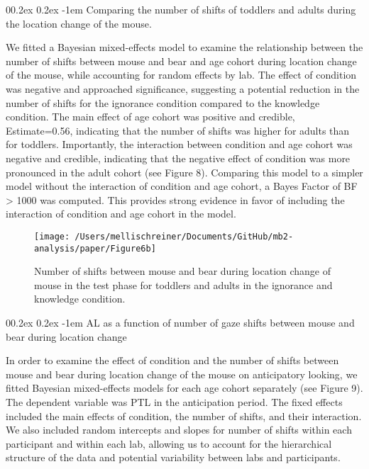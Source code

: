 \documentclass[
  man,floatsintext]{apa6}
\makeatletter
\let\oldparagraph\paragraph
\renewcommand{\paragraph}{
    \@ifstar
      \xxxParagraphStar
      \xxxParagraphNoStar
  }
\newcommand{\xxxParagraphStar}[1]{\oldparagraph*{#1}\mbox{}}
\newcommand{\xxxParagraphNoStar}[1]{\oldparagraph{#1}\mbox{}}
\renewcommand{\paragraph}{\@startsection{paragraph}{4}{\parindent}%
  {0\baselineskip \@plus 0.2ex \@minus 0.2ex}%
  {-1em}%
  {\normalfont\normalsize\bfseries\itshape\typesectitle}}
\makeatother
\begin{document}
\paragraph{Comparing the number of shifts of toddlers and adults during the location change of the mouse.}\label{comparing-the-number-of-shifts-of-toddlers-and-adults-during-the-location-change-of-the-mouse.}

We fitted a Bayesian mixed-effects model to examine the relationship between the number of shifts between mouse and bear and age cohort during location change of the mouse, while accounting for random effects by lab. The effect of condition was negative and approached significance, suggesting a potential reduction in the number of shifts for the ignorance condition compared to the knowledge condition. The main effect of age cohort was positive and credible, Estimate=0.56, indicating that the number of shifts was higher for adults than for toddlers. Importantly, the interaction between condition and age cohort was negative and credible, indicating that the negative effect of condition was more pronounced in the adult cohort (see Figure 8).
Comparing this model to a simpler model without the interaction of condition and age cohort, a Bayes Factor of BF \textgreater{} 1000 was computed.
This provides strong evidence in favor of including the interaction of condition and age cohort in the model.

\begin{figure}

{\centering \texttt{[image: /Users/mellischreiner/Documents/GitHub/mb2-analysis/paper/Figure6b]} 

}

\caption{Number of shifts between mouse and bear during location change of mouse in the test phase for toddlers and adults in the ignorance and knowledge condition.}\label{fig:fig8}
\end{figure}

\paragraph{AL as a function of number of gaze shifts between mouse and bear during location change}\label{al-as-a-function-of-number-of-gaze-shifts-between-mouse-and-bear-during-location-change}

In order to examine the effect of condition and the number of shifts between mouse and bear during location change of the mouse on anticipatory looking, we fitted Bayesian mixed-effects models for each age cohort separately (see Figure 9). The dependent variable was PTL in the anticipation period. The fixed effects included the main effects of condition, the number of shifts, and their interaction. We also included random intercepts and slopes for number of shifts within each participant and within each lab, allowing us to account for the hierarchical structure of the data and potential variability between labs and participants.
\end{document}
